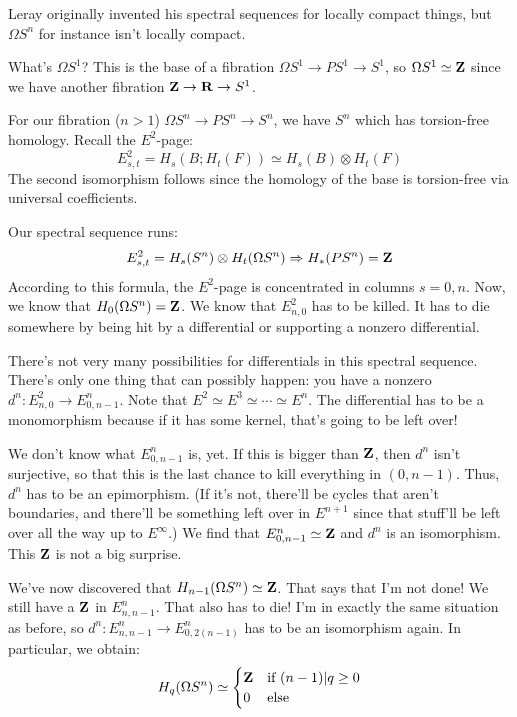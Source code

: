 Leray originally invented his spectral sequences for locally compact things, but $\Omega S^n$ for instance isn't locally compact.
\begin{example}
    What's $\Omega S^1$?
    This is the base of a fibration $\Omega S^1 \to PS^1 \to S^1$, so $\Omega S^1 \simeq \mathbf Z$ since we have another fibration $\mathbf Z\to \mathbf R\to S^1$.

    For our fibration ($n>1$) $\Omega S^n\to PS^n \to S^n$, we have $S^n$ which has torsion-free homology. Recall the $E^2$-page:
    $$
    E^2_{s,t} = H_s(B;H_t(F)) \simeq H_s(B)\otimes H_t(F)
    $$
    The second isomorphism follows since the homology of the base is torsion-free via universal coefficients.

    Our spectral sequence runs:
    $$E^2_{s,t} = H_s(S^n) \otimes H_t(\Omega S^n) \Rightarrow H_{\ast}(PS^n) = \mathbf Z$$
    According to this formula, the $E^2$-page is concentrated in columns $s=0,n$.
    Now, we know that $H_0(\Omega S^n) = \mathbf Z$.
    We know that $E^2_{n,0}$ has to be killed.
    It has to die somewhere by being hit by a differential or supporting a nonzero differential.

    There's not very many possibilities for differentials in this spectral sequence.
    There's only one thing that can possibly happen: you have a nonzero $d^n:E^2_{n,0} \to E^n_{0,n-1}$.
    Note that $E^2\simeq E^3 \simeq \cdots \simeq E^n$.
    The differential has to be a monomorphism because if it has some kernel, that's going to be left over!

    We don't know what $E^n_{0,n-1}$ is, yet.
    If this is bigger than $\mathbf Z$, then $d^n$ isn't surjective, so that this is the last chance to kill everything in $(0,n-1)$.
    Thus, $d^n$ has to be an epimorphism.
    (If it's not, there'll be cycles that aren't boundaries, and there'll be something left over in $E^{n+1}$ since that stuff'll be left over all the way up to $E^\infty$.)
    We find that $E^n_{0,n-1} \simeq \mathbf Z$ and $d^n$ is an isomorphism.
    This $\mathbf Z$ is not a big surprise.

    We've now discovered that $H_{n-1}(\Omega S^n) \simeq \mathbf Z$.
    That says that I'm not done!
    We still have a $\mathbf Z$ in $E^n_{n,n-1}$.
    That also has to die!
    I'm in exactly the same situation as before, so $d^n:E^n_{n,n-1}\to E^n_{0,2(n-1)}$ has to be an isomorphism again.
    In particular, we obtain:
    \begin{equation*}
	H_q(\Omega S^n) \simeq \begin{cases}
	    \mathbf Z & \text{if }(n-1)|q\geq 0\\
	    0 & \text{else}
	\end{cases}
    \end{equation*}
\end{example}
